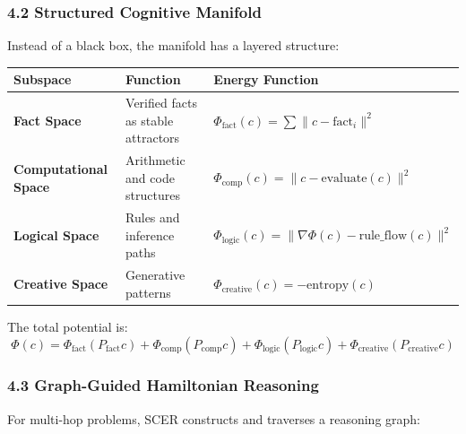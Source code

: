\documentclass[
  11pt,
  a4paper,
]{article}
\begin{document}
\subsubsection{4.2 Structured Cognitive
Manifold}\label{structured-cognitive-manifold}

Instead of a black box, the manifold has a layered structure:

\begin{longtable}[]{@{}
  >{\raggedright\arraybackslash}p{}
  >{\raggedright\arraybackslash}p{}
  >{\raggedright\arraybackslash}p{}@{}}
\toprule\noalign{}
\begin{minipage}[b]{\linewidth}\raggedright
Subspace
\end{minipage} & \begin{minipage}[b]{\linewidth}\raggedright
Function
\end{minipage} & \begin{minipage}[b]{\linewidth}\raggedright
Energy Function
\end{minipage} \\
\midrule\noalign{}
\endhead
\bottomrule\noalign{}
\endlastfoot
\textbf{Fact Space} & Verified facts as stable attractors &
\(\Phi_{\text{fact}}(c) = \sum \|c - \text{fact}_i\|^2\) \\
\textbf{Computational Space} & Arithmetic and code structures &
\(\Phi_{\text{comp}}(c) = \|c - \text{evaluate}(c)\|^2\) \\
\textbf{Logical Space} & Rules and inference paths &
\(\Phi_{\text{logic}}(c) = \|\nabla\Phi(c) - \text{rule\_flow}(c)\|^2\) \\
\textbf{Creative Space} & Generative patterns &
\(\Phi_{\text{creative}}(c) = -\text{entropy}(c)\) \\
\end{longtable}

The total potential is: \[
\Phi(c) = \Phi_{\text{fact}}(P_{\text{fact}}c) + \Phi_{\text{comp}}(P_{\text{comp}}c) + \Phi_{\text{logic}}(P_{\text{logic}}c) + \Phi_{\text{creative}}(P_{\text{creative}}c)
\]

\subsubsection{4.3 Graph-Guided Hamiltonian
Reasoning}\label{graph-guided-hamiltonian-reasoning}

For multi-hop problems, SCER constructs and traverses a reasoning graph:
\end{document}
